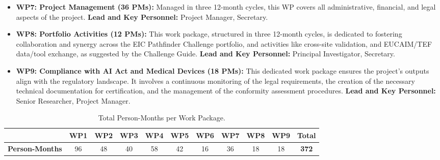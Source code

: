 \documentclass[11pt, a4paper]{article}
\begin{document}
\begin{itemize}
    \item \textbf{WP7: Project Management (36 PMs):} Managed in three 12-month cycles, this WP covers all administrative, financial, and legal aspects of the project. \textbf{Lead and Key Personnel:} Project Manager, Secretary.
    \item \textbf{WP8: Portfolio Activities (12 PMs):} This work package, structured in three 12-month cycles, is dedicated to fostering collaboration and synergy across the EIC Pathfinder Challenge portfolio, and activities like cross-site validation, and EUCAIM/TEF data/tool exchange, as suggested by the Challenge Guide. \textbf{Lead and Key Personnel:} Principal Investigator, Secretary.
    \item \textbf{WP9: Compliance with AI Act and Medical Devices (18 PMs):} This dedicated work package ensures the project's outputs align with the regulatory landscape. It involves a continuous monitoring of the legal requirements, the creation of the necessary technical documentation for certification, and the management of the conformity assessment procedures. \textbf{Lead and Key Personnel:} Senior Researcher, Project Manager.
\end{itemize}

\begin{table}[H]
    \centering
    \caption{Total Person-Months per Work Package.}
    \label{tab:person_months}
\begin{tabular}{lccccccccc|c}
        \toprule
& \textbf{WP1} & \textbf{WP2} & \textbf{WP3} & \textbf{WP4} & \textbf{WP5} & \textbf{WP6} & \textbf{WP7} & \textbf{WP8} & \textbf{WP9} & \textbf{Total} \\
        \midrule
\textbf{Person-Months} & 96 & 48 & 40 & 58 & 42 & 16 & 36 & 18 & 18 & \textbf{372} \\
        \bottomrule
    \end{tabular}
\end{table}
\end{document}
